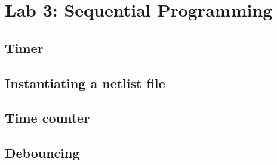 \chapter{Lab 3: Sequential Programming} \label{day3}

\section{Timer}





\section{Instantiating a netlist file}



\section{Time counter}







\section{Debouncing}


